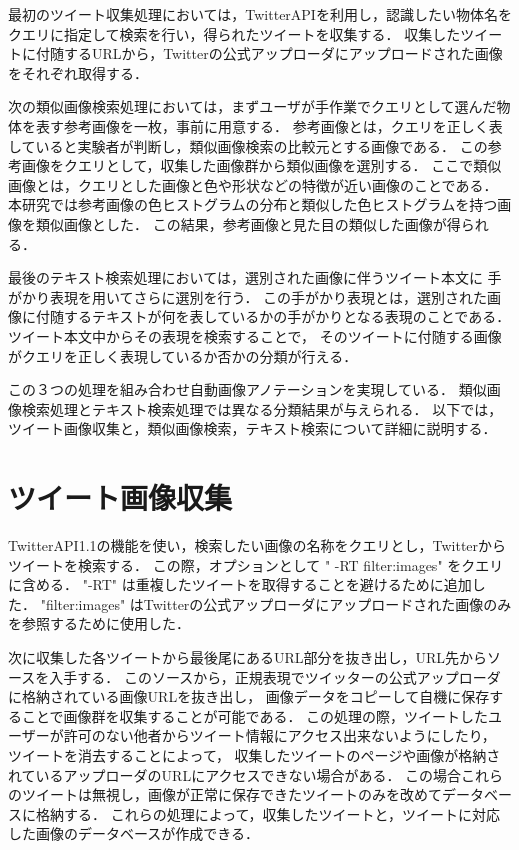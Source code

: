 
最初のツイート収集処理においては，TwitterAPIを利用し，認識したい物体名をクエリに指定して検索を行い，得られたツイートを収集する．
収集したツイートに付随するURLから，Twitterの公式アップローダにアップロードされた画像をそれぞれ取得する．

次の類似画像検索処理においては，まずユーザが手作業でクエリとして選んだ物体を表す参考画像を一枚，事前に用意する．
参考画像とは，クエリを正しく表していると実験者が判断し，類似画像検索の比較元とする画像である．
この参考画像をクエリとして，収集した画像群から類似画像を選別する．
ここで類似画像とは，クエリとした画像と色や形状などの特徴が近い画像のことである．
本研究では参考画像の色ヒストグラムの分布と類似した色ヒストグラムを持つ画像を類似画像とした．
この結果，参考画像と見た目の類似した画像が得られる．

最後のテキスト検索処理においては，選別された画像に伴うツイート本文に
手がかり表現を用いてさらに選別を行う．
この手がかり表現とは，選別された画像に付随するテキストが何を表しているかの手がかりとなる表現のことである．
ツイート本文中からその表現を検索することで，
そのツイートに付随する画像がクエリを正しく表現しているか否かの分類が行える．

この３つの処理を組み合わせ自動画像アノテーションを実現している．
類似画像検索処理とテキスト検索処理では異なる分類結果が与えられる．
以下では，ツイート画像収集と，類似画像検索，テキスト検索について詳細に説明する．

\section{ツイート画像収集}
\label{sec:tweetCollect}
TwitterAPI1.1の機能を使い，検索したい画像の名称をクエリとし，Twitterからツイートを検索する．
この際，オプションとして " -RT filter:images" をクエリに含める．
"-RT" は重複したツイートを取得することを避けるために追加した．
"filter:images" はTwitterの公式アップローダにアップロードされた画像のみを参照するために使用した．

次に収集した各ツイートから最後尾にあるURL部分を抜き出し，URL先からソースを入手する．
このソースから，正規表現でツイッターの公式アップローダに格納されている画像URLを抜き出し，
画像データをコピーして自機に保存することで画像群を収集することが可能である．
この処理の際，ツイートしたユーザーが許可のない他者からツイート情報にアクセス出来ないようにしたり，
ツイートを消去することによって，
収集したツイートのページや画像が格納されているアップローダのURLにアクセスできない場合がある．
この場合これらのツイートは無視し，画像が正常に保存できたツイートのみを改めてデータベースに格納する．
これらの処理によって，収集したツイートと，ツイートに対応した画像のデータベースが作成できる．


